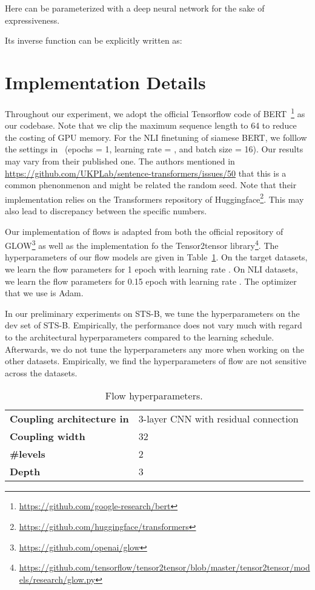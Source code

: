 \documentclass[11pt,a4paper]{article}
\begin{document}
Here  can be parameterized with a deep neural network for the sake of expressiveness. 

Its inverse function  can be explicitly written as:


\section{Implementation Details}
\label{sec:appendix:implementation}

Throughout our experiment, we adopt the official Tensorflow code of BERT~\footnote{\url{https://github.com/google-research/bert}} as our codebase. Note that we clip the maximum sequence length to 64 to reduce the costing of GPU memory. For the NLI finetuning of siamese BERT, we folllow the settings in~\citep{reimers2019sentence} (epochs = 1,  learning rate = , and batch size = 16). Our results may vary from their published one. The authors mentioned in \url{https://github.com/UKPLab/sentence-transformers/issues/50} that this is a common phenonmenon and might be related the random seed. Note that their implementation relies on the Transformers repository of Huggingface\footnote{\url{https://github.com/huggingface/transformers}}. This may also lead to discrepancy between the specific numbers.








Our implementation of flows is adapted from both the official repository of GLOW\footnote{\url{https://github.com/openai/glow}} as well as the implementation fo the Tensor2tensor library\footnote{\url{https://github.com/tensorflow/tensor2tensor/blob/master/tensor2tensor/models/research/glow.py}}. The hyperparameters of our flow models are given in Table~\ref{tab:flow:hyperparameter}. On the target datasets, we learn the flow parameters for 1 epoch with learning rate . On NLI datasets, we learn the flow parameters for 0.15 epoch with learning rate . The optimizer that we use is Adam. 

In our preliminary experiments on STS-B, we tune the hyperparameters on the dev set of STS-B. Empirically, the performance does not vary much with regard to the architectural hyperparameters compared to the learning schedule. Afterwards, we do not tune the hyperparameters any more when working on the other datasets. Empirically, we find the hyperparameters of flow are not sensitive across the datasets.

\begin{table}[!h]
\centering
\begin{tabular}{ll}
\toprule
\bf Coupling architecture in  &  3-layer CNN with residual connection \\
\bf Coupling width & 32 \\
\bf \#levels & 2 \\
\bf Depth & 3 \\
\bottomrule
\end{tabular}
\caption{\label{tab:flow:hyperparameter} Flow hyperparameters.}
\end{table}
\end{document}
